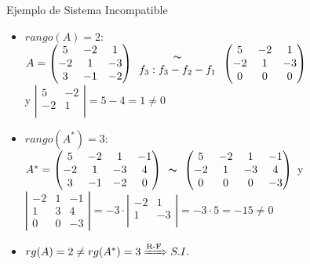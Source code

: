 \documentclass[11pt]{beamer}
\begin{document}
\begin{frame}{Ejemplo de Sistema Incompatible}
 \begin{itemize}[<+->]
    \item $rango(A) =2$: \\  $A=\left(\begin{matrix}5 & -2 & 1\\-2 & 1 & -3\\3 & -1 & -2\end{matrix}\right) \begin{array}{c}
     \thicksim   \\
     f_3:f_3-f_2-f_1 \\
 \end{array}
 \left(\begin{matrix}5 & -2 & 1\\-2 & 1 & -3\\0 & 0 & 0\end{matrix}\right)$ \\ y $\left|\begin{matrix}5 & -2 \\-2 & 1 \\ \end{matrix}\right| = 5-4=1\neq0 $ 
    \item $rango(A^*) =3$: \\
    $A^*=\left(\begin{matrix}5 & -2 & 1 & -1\\-2 & 1 & -3 & 4\\3 & -1 & -2 & 0\end{matrix}\right)\begin{array}{c}
     \thicksim   \\
    \end{array}
    \left(\begin{matrix}5 & -2 & 1 & -1\\-2 & 1 & -3 & 4\\0 & 0 & 0 & -3\end{matrix}\right)$ y  
    $\left|\begin{matrix}-2 & 1 & -1 \\1 & 3 & 4 \\ 0&0&-3 \end{matrix}\right| = -3\cdot   
    \left|\begin{matrix}-2 & 1\\1 & -3 \\ \end{matrix}\right|=-3\cdot 5=-15\neq0$
    
    \item $rg(A)=2 \neq rg(A^*)=3 \xRightarrow{\text{R-F}} S.I. $
\end{itemize}
\end{frame}
\end{document}
